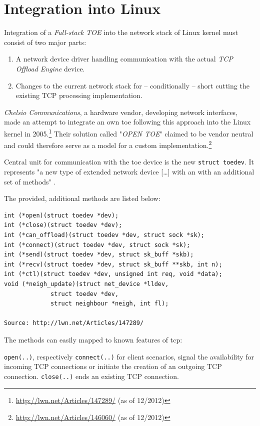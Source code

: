 \section{Integration into Linux}

Integration of a \textit{Full-stack TOE} into the network stack of Linux kernel must consist of two major parts:

\begin{enumerate}
\item A network device driver handling communication with the actual \textit{TCP Offload Engine} device.
\item Changes to the current network stack for -- conditionally -- short cutting the existing TCP processing implementation.
\end{enumerate}

\textit{Chelsio Communications}, a hardware vendor, developing network interfaces, made an attempt to integrate an own \gls{toe} following this approach into the Linux kernel in 2005.\footnote{\url{http://lwn.net/Articles/147289/} (as of 12/2012)} Their solution called "\textit{OPEN TOE}" claimed to be vendor neutral and could therefore serve as a model for a custom implementation.\footnote{\url{http://lwn.net/Articles/146060/} (as of 12/2012)}

Central unit for communication with the \gls{toe} device is the new \texttt{struct toedev}. It represents "a new type of extended network device [\dots] with an with an additional set of methods" \cite{linux-toe}.

The provided, additional methods are listed below:

\begin{verbatim}
int (*open)(struct toedev *dev);
int (*close)(struct toedev *dev);
int (*can_offload)(struct toedev *dev, struct sock *sk);
int (*connect)(struct toedev *dev, struct sock *sk);
int (*send)(struct toedev *dev, struct sk_buff *skb);
int (*recv)(struct toedev *dev, struct sk_buff **skb, int n);
int (*ctl)(struct toedev *dev, unsigned int req, void *data);
void (*neigh_update)(struct net_device *lldev,
		     struct toedev *dev,
		     struct neighbour *neigh, int fl);

Source: http://lwn.net/Articles/147289/
\end{verbatim}

The methods can easily mapped to known features of \gls{tcp}:

\texttt{open(..)}, respectively \texttt{connect(..)} for client scenarios, signal the availability for incoming TCP connections or initiate the creation of an outgoing TCP connection. \texttt{close(..)} ends an existing TCP connection.

